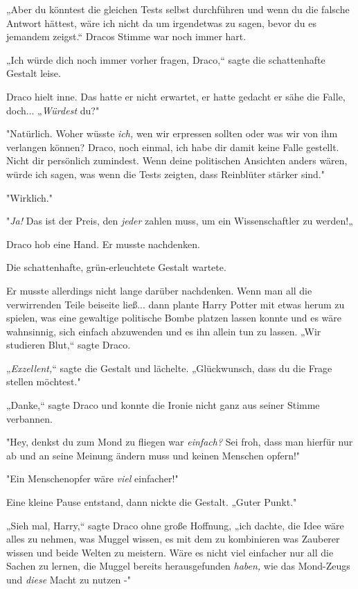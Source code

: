 {„Aber du könntest die gleichen Tests selbst durchführen und wenn du die falsche Antwort hättest, wäre ich nicht da um irgendetwas zu sagen, bevor du es jemandem zeigst.“ Dracos Stimme war noch immer hart.

„Ich würde dich noch immer vorher fragen, Draco,“ sagte die schattenhafte Gestalt leise.

Draco hielt inne. Das hatte er nicht erwartet, er hatte gedacht er sähe die Falle, doch... „\emph{Würdest} du?"

"Natürlich. Woher wüsste \emph{ich,} wen wir erpressen sollten oder was wir von ihm verlangen können? Draco, noch einmal, ich habe dir damit keine Falle gestellt. Nicht dir persönlich zumindest. Wenn deine politischen Ansichten anders wären, würde ich sagen, was wenn die Tests zeigten, dass Reinblüter stärker sind."

"Wirklich."

"\emph{Ja!} Das ist der Preis, den \emph{jeder} zahlen muss, um ein Wissenschaftler zu werden!„

Draco hob eine Hand. Er musste nachdenken.

Die schattenhafte, grün-erleuchtete Gestalt wartete.

Er musste allerdings nicht lange darüber nachdenken. Wenn man all die verwirrenden Teile beiseite ließ... dann plante Harry Potter mit etwas herum zu spielen, was eine gewaltige politische Bombe platzen lassen konnte und es wäre wahnsinnig, sich einfach abzuwenden und es ihn allein tun zu lassen. „Wir studieren Blut,“ sagte Draco.

„\emph{Exzellent,}“ sagte die Gestalt und lächelte. „Glückwunsch, dass du die Frage stellen möchtest."

„Danke,“ sagte Draco und konnte die Ironie nicht ganz aus seiner Stimme verbannen.

"Hey, denkst du zum Mond zu fliegen war \emph{einfach?} Sei froh, dass man hierfür nur ab und an seine Meinung ändern muss und keinen Menschen opfern!"

"Ein Menschenopfer wäre \emph{viel} einfacher!"

Eine kleine Pause entstand, dann nickte die Gestalt. „Guter Punkt."

„Sieh mal, Harry,“ sagte Draco ohne große Hoffnung, „ich dachte, die Idee wäre alles zu nehmen, was Muggel wissen, es mit dem zu kombinieren was Zauberer wissen und beide Welten zu meistern. Wäre es nicht viel einfacher nur all die Sachen zu lernen, die Muggel bereits herausgefunden \emph{haben,} wie das Mond-Zeugs und \emph{diese} Macht zu nutzen -"

}
